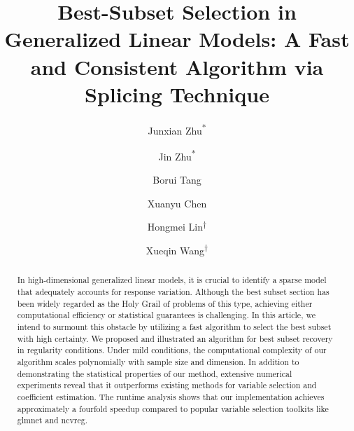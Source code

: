 \documentclass[12pt]{article}
\begin{document}
\title{Best-Subset Selection in Generalized Linear Models: A Fast and Consistent Algorithm via Splicing Technique}


\author[1]{Junxian Zhu\textsuperscript{*}}
\author[2]{Jin Zhu\textsuperscript{*}}
\author[4]{Borui Tang}
\author[2]{Xuanyu Chen}
\author[3]{Hongmei Lin\textsuperscript{$\dagger$}}
\author[4]{Xueqin Wang\textsuperscript{$\dagger$}}


\date{}
\maketitle \sloppy

\begin{abstract}
  In high-dimensional generalized linear models, it is crucial to identify a sparse model that adequately accounts for response variation. Although the best subset section has been widely regarded as the Holy Grail of problems of this type, achieving either computational efficiency or statistical guarantees is challenging. In this article, we intend to surmount this obstacle by utilizing a fast algorithm to select the best subset with high certainty. We proposed and illustrated an algorithm for best subset recovery in regularity conditions. Under mild conditions, the computational complexity of our algorithm scales polynomially with sample size and dimension. In addition to demonstrating the statistical properties of our method, extensive numerical experiments reveal that it outperforms existing methods for variable selection and coefficient estimation. The runtime analysis shows that our implementation achieves approximately a fourfold speedup compared to popular variable selection toolkits like \textsf{glmnet} and \textsf{ncvreg}.
\end{abstract}
\end{document}
